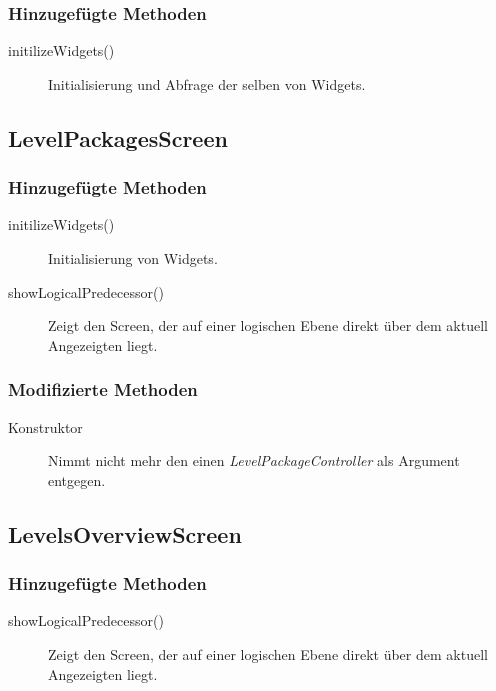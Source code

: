 \subsubsection{Hinzugefügte Methoden}
\begin{description}
\item[initilizeWidgets()]
Initialisierung und Abfrage der selben von Widgets.

\end{description}



\subsection{LevelPackagesScreen}

\subsubsection{Hinzugefügte Methoden}
\begin{description}
\item[initilizeWidgets()]
Initialisierung von Widgets.
\item[showLogicalPredecessor()]
Zeigt den Screen, der auf einer logischen Ebene direkt über dem aktuell Angezeigten liegt.

\end{description}

\subsubsection{Modifizierte Methoden}
\begin{description}
\item[Konstruktor]
Nimmt nicht mehr den einen \emph{LevelPackageController} als Argument entgegen.

\end{description}


\subsection{LevelsOverviewScreen}
\subsubsection{Hinzugefügte Methoden}
\begin{description}
\item[showLogicalPredecessor()]
Zeigt den Screen, der auf einer logischen Ebene direkt über dem aktuell Angezeigten liegt.

\end{description}


